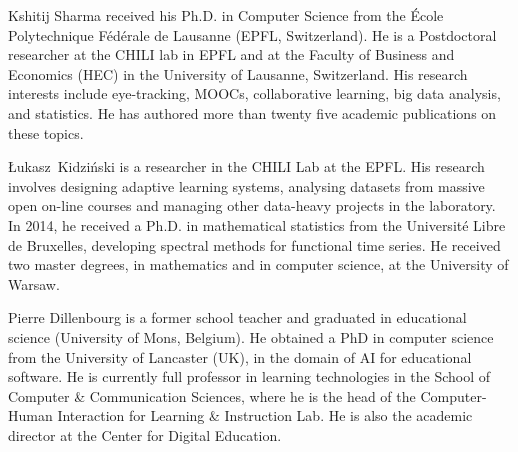 \documentclass[10pt,journal,compsoc]{IEEEtran}
\begin{document}
\begin{IEEEbiography}{Kshitij Sharma} received his Ph.D. in Computer Science from the École Polytechnique Fédérale de Lausanne (EPFL, Switzerland). He is a Postdoctoral researcher at the CHILI lab in EPFL and at the Faculty of Business and Economics (HEC) in the University of Lausanne, Switzerland. His research interests include eye-tracking, MOOCs, collaborative learning, big data analysis, and statistics. He has authored more than twenty five academic publications on these topics.
\end{IEEEbiography}

\begin{IEEEbiography}{{\L}ukasz~Kidzi\'nski}
 is a researcher in the CHILI Lab at the EPFL. His research involves designing adaptive learning systems, analysing datasets from massive open on-line courses and managing other data-heavy projects in the laboratory. In 2014, he received a Ph.D. in mathematical statistics from the Universit\'e Libre de Bruxelles, developing spectral methods for functional time series. He received two master degrees, in mathematics and in computer science, at the University of Warsaw.
\end{IEEEbiography}


\begin{IEEEbiography}{Pierre Dillenbourg} is a former school teacher and graduated in educational science (University of Mons, Belgium). He obtained a PhD in computer science from the University of Lancaster (UK), in the domain of AI for educational software. He is currently full professor in learning technologies in the School of Computer \& Communication Sciences, where he is the head of the Computer-Human Interaction for Learning \& Instruction Lab. He is also the academic director at the Center for Digital Education.
\end{IEEEbiography}
\end{document}

